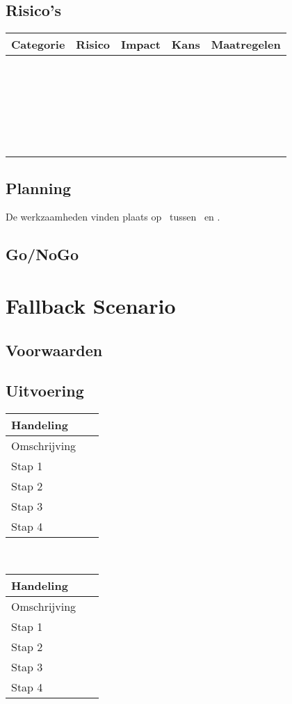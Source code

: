 \documentclass[10pt,a4paper]{report}
\begin{document}
\section{Risico's}
\begin{tabular}{| l | l | l | l | l|}
\hline
\rowcolor[gray]{0.84}Categorie & Risico & Impact & Kans & Maatregelen\\
\hline
\  & \ & \ & \ & \ \\
\hline
\  & \ & \ & \ & \ \\
\hline
\  & \ & \ & \ & \ \\
\hline
\  & \ & \ & \ & \ \\
\hline
\  & \ & \ & \ & \ \\
\hline
\end{tabular}
\section{Planning}
De werkzaamheden vinden plaats op \StartDatum \ tussen \StartTijd \ en \EindTijd.
\section{Go/NoGo}
\chapter{Fallback Scenario}
\section{Voorwaarden}
\section{Uitvoering}
\begin{tabular}{| l | l |}
\hline
\cellcolor[gray]{0.84}Handeling & \ \\
\hline
\cellcolor[gray]{0.84}Omschrijving & \ \\
\hline
\cellcolor[gray]{0.84}Stap 1 & \ \\
\hline
\cellcolor[gray]{0.84}Stap 2 & \ \\
\hline
\cellcolor[gray]{0.84}Stap 3 & \ \\
\hline
\cellcolor[gray]{0.84}Stap 4 & \ \\
\hline
\end{tabular}
\\

\begin{tabular}{| l | l |}
\hline
\cellcolor[gray]{0.84}Handeling & \ \\
\hline
\cellcolor[gray]{0.84}Omschrijving & \ \\
\hline
\cellcolor[gray]{0.84}Stap 1 & \ \\
\hline
\cellcolor[gray]{0.84}Stap 2 & \ \\
\hline
\cellcolor[gray]{0.84}Stap 3 & \ \\
\hline
\cellcolor[gray]{0.84}Stap 4 & \ \\
\hline
\end{tabular}
\\
\end{document}
